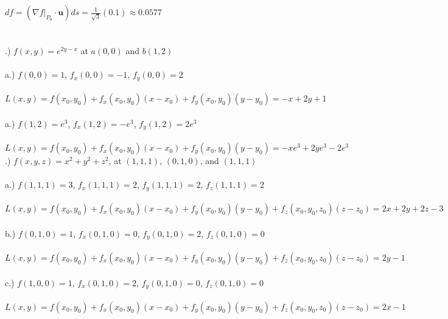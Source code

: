 \documentclass[12pt]{article}
\begin{document}
$df  = (\nabla f\Big|_{P_{0}} \cdot \mathbf{u})ds = \frac{1}{\sqrt{3}}(0.1) \approx 0.0577$\\\\\\
.) $f(x,y) = e^{2y-x}$ at $a(0, 0)$ and $b(1,2)$\\\\
\noindent a.) $f(0, 0) = 1$, \hspace{10pt} $f_{x}(0,0) = -1$, \hspace{10pt} $f_{y}(0,0) = 2$\\\\
\noindent  $L(x, y) = f(x_{0}, y_{0}) + f_{x}(x_{0}, y_{0})(x - x_{0}) + f_{y}(x_{0}, y_{0})(y-y_{0}) = -x+2y + 1$\\\\
\noindent a.) $f(1, 2) = e^{3}$, \hspace{10pt} $f_{x}(1,2) = -e^{3}$, \hspace{10pt} $f_{y}(1,2) = 2e^{3}$\\\\
\noindent  $L(x, y) = f(x_{0}, y_{0}) + f_{x}(x_{0}, y_{0})(x - x_{0}) + f_{y}(x_{0}, y_{0})(y-y_{0}) = -xe^{3}+2ye^{3} - 2e^{3}$\clearpage
{}.) $f(x, y, z) = x^{2} + y^{2} + z^{2}$, at  $(1,1,1)$, $(0,1,0)$, and $(1,1,1)$ \\\\
\noindent a.) $f(1, 1, 1) = 3$, \hspace{10pt} $f_{x}(1,1,1) = 2$, \hspace{10pt} $f_{y}(1,1,1) = 2$, \hspace{10pt} $f_{z}(1,1,1) = 2$\\\\
\noindent  $L(x, y) = f(x_{0}, y_{0}) + f_{x}(x_{0}, y_{0})(x - x_{0}) + f_{y}(x_{0}, y_{0})(y-y_{0})  + f_{z}(x_{0}, y_{0}, z_{0})(z - z_{0})= 2x+2y+2z-3$\\\\
\noindent b.) $f(0, 1, 0) = 1$, \hspace{10pt} $f_{x}(0,1,0) = 0$, \hspace{10pt} $f_{y}(0,1,0) = 2$, \hspace{10pt} $f_{z}(0,1,0) = 0$\\\\
\noindent  $L(x, y) = f(x_{0}, y_{0}) + f_{x}(x_{0}, y_{0})(x - x_{0}) + f_{y}(x_{0}, y_{0})(y-y_{0})  + f_{z}(x_{0}, y_{0}, z_{0})(z - z_{0})= 2y-1$\\\\
\noindent c.) $f(1, 0, 0) = 1$, \hspace{10pt} $f_{x}(0,1,0) = 2$, \hspace{10pt} $f_{y}(0,1,0) = 0$, \hspace{10pt} $f_{z}(0,1,0) = 0$\\\\
\noindent  $L(x, y) = f(x_{0}, y_{0}) + f_{x}(x_{0}, y_{0})(x - x_{0}) + f_{y}(x_{0}, y_{0})(y-y_{0})  + f_{z}(x_{0}, y_{0}, z_{0})(z - z_{0})= 2x-1$\\\\
\end{document}

